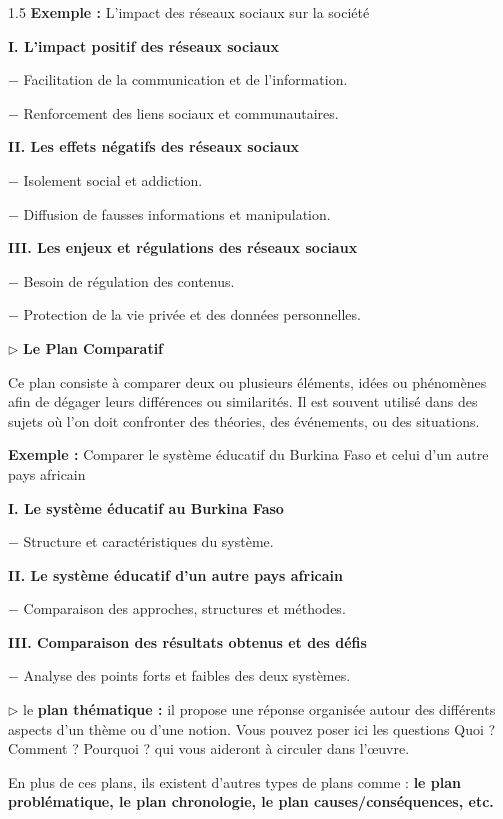 \documentclass[12pt]{article}
\begin{document}
\begin{spacing}{1.5}
\textbf{Exemple :}  L'impact des réseaux sociaux sur la société

\textbf{I. L'impact positif des réseaux sociaux}

$-$ Facilitation de la communication et de l'information.

$-$ Renforcement des liens sociaux et communautaires.

\textbf{II. Les effets négatifs des réseaux sociaux
}

$-$ Isolement social et addiction.

$-$ Diffusion de fausses informations et manipulation.

\textbf{III. Les enjeux et régulations des réseaux sociaux}

$-$ Besoin de régulation des contenus.

$-$ Protection de la vie privée et des données personnelles.

\quad




$\rhd$ \textbf{ Le Plan Comparatif}

Ce plan consiste à comparer deux ou plusieurs éléments, idées ou phénomènes afin de dégager leurs différences ou similarités. Il est souvent utilisé dans des sujets où l'on doit confronter des théories, des événements, ou des situations.

\textbf{Exemple : }Comparer le système éducatif du Burkina Faso et celui d'un autre pays africain

\textbf{I. Le système éducatif au Burkina Faso}

$-$ Structure et caractéristiques du système.

\textbf{II. Le système éducatif d'un autre pays africain}

$-$ Comparaison des approches, structures et méthodes.

\textbf{III. Comparaison des résultats obtenus et des défis}

$-$ Analyse des points forts et faibles des deux systèmes.



$\rhd$ le \textbf{plan thématique :} il propose une réponse organisée autour des différents aspects d'un thème ou d'une notion. Vous pouvez poser ici les questions Quoi ? Comment ? Pourquoi ? qui vous aideront 
à circuler dans l'œuvre.

 \vspace*{1.5cm}
 
 En plus de ces plans, ils existent d'autres types de plans comme : \textbf{le plan problématique, le plan chronologie, le plan causes/conséquences, etc. }


\end{spacing}
\end{document}
